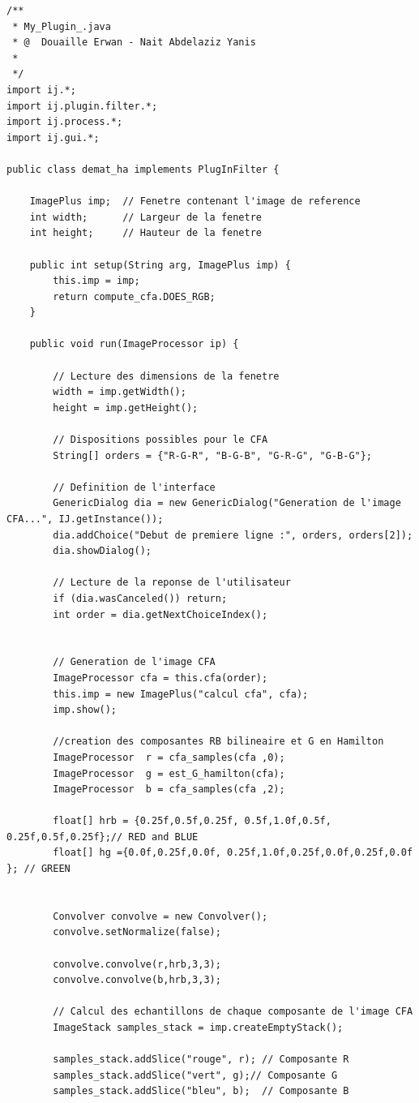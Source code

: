 \documentclass[a4paper,12pt]{report}
\begin{document}
\begin{lstlisting}[style=Java]
/**
 * My_Plugin_.java 
 * @  Douaille Erwan - Nait Abdelaziz Yanis
 *
 */
import ij.*;
import ij.plugin.filter.*;
import ij.process.*;
import ij.gui.*;

public class demat_ha implements PlugInFilter {

	ImagePlus imp;	// Fenetre contenant l'image de reference
	int width;		// Largeur de la fenetre
	int height;		// Hauteur de la fenetre

	public int setup(String arg, ImagePlus imp) {
		this.imp = imp;
		return compute_cfa.DOES_RGB;
	}

	public void run(ImageProcessor ip) {

		// Lecture des dimensions de la fenetre
		width = imp.getWidth();
		height = imp.getHeight();

		// Dispositions possibles pour le CFA
		String[] orders = {"R-G-R", "B-G-B", "G-R-G", "G-B-G"};

		// Definition de l'interface
		GenericDialog dia = new GenericDialog("Generation de l'image CFA...", IJ.getInstance());
		dia.addChoice("Debut de premiere ligne :", orders, orders[2]);
		dia.showDialog();

		// Lecture de la reponse de l'utilisateur
		if (dia.wasCanceled()) return;
		int order = dia.getNextChoiceIndex();


		// Generation de l'image CFA
		ImageProcessor cfa = this.cfa(order);
		this.imp = new ImagePlus("calcul cfa", cfa);
		imp.show();

		//creation des composantes RB bilineaire et G en Hamilton
		ImageProcessor  r = cfa_samples(cfa ,0);
		ImageProcessor  g = est_G_hamilton(cfa);
		ImageProcessor  b = cfa_samples(cfa ,2);

		float[] hrb = {0.25f,0.5f,0.25f, 0.5f,1.0f,0.5f, 0.25f,0.5f,0.25f};// RED and BLUE
		float[] hg ={0.0f,0.25f,0.0f, 0.25f,1.0f,0.25f,0.0f,0.25f,0.0f	}; // GREEN


		Convolver convolve = new Convolver();
		convolve.setNormalize(false);
		
		convolve.convolve(r,hrb,3,3);				
		convolve.convolve(b,hrb,3,3);
		
		// Calcul des echantillons de chaque composante de l'image CFA
		ImageStack samples_stack = imp.createEmptyStack();

		samples_stack.addSlice("rouge", r);	// Composante R
		samples_stack.addSlice("vert", g);// Composante G
		samples_stack.addSlice("bleu", b);	// Composante B


\end{lstlisting}
\end{document}
